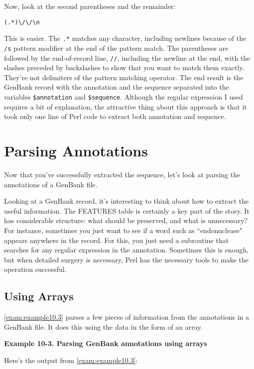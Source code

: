 Now, look at the second parentheses and the remainder:

\begin{lstlisting}
(.*)\/\/\n
\end{lstlisting}

This is easier. The \verb|.*| matches any character, including newlines because of the \verb|/s| pattern modifier at the end of the pattern match. The parentheses are followed by the end-of-record line, \verb|//|, including the newline at the end, with the slashes preceded by backslashes to show that you want to match them exactly. They're not delimiters of the pattern matching operator. The end result is the GenBank record with the annotation and the sequence separated into the variables \verb|$annotation| and \verb|$sequence|. Although the regular expression I used requires a bit of explanation, the attractive thing about this approach is that it took only one line of Perl code to extract both annotation and sequence.

\section{Parsing Annotations}
Now that you've successfully extracted the sequence, let's look at parsing the annotations of a GenBank file.

Looking at a GenBank record, it's interesting to think about how to extract the useful information. The FEATURES table is certainly a key part of the story. It has considerable structure: what should be preserved, and what is unnecessary? For instance, sometimes you just want to see if a word such as ``endonuclease" appears anywhere in the record. For this, you just need a subroutine that searches for any regular expression in the annotation. Sometimes this is enough, but when detailed surgery is necessary, Perl has the necessary tools to make the operation successful.

\subsection{Using Arrays}
\autoref{exam:example10.3} parses a few pieces of information from the annotations in a GenBank file. It does this using the data in the form of an array.
  
\textbf{Example 10-3. Parsing GenBank annotations using arrays}


Here's the output from \autoref{exam:example10.3}:

